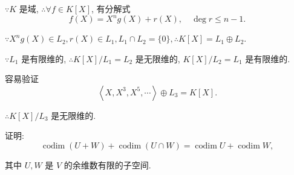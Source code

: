 \documentclass[color=black,device=normal,lang=cn,mode=geye]{elegantnote}
\begin{document}
\begin{solution}
    $\because K$ 是域, $\therefore\forall f\in K[X]$, 有分解式
    \[f(X)=X^ng(X)+r(X),\quad\deg r\leq n-1.\]

    $\because X^ng(X)\in L_2,r(X)\in L_1,L_1\cap L_2=\{0\},\therefore K[X]=L_1\oplus L_2$.

    $\because L_1$ 是有限维的, $\therefore K[X]/L_1=L_2$ 是无限维的, $K[X]/L_2=L_1$ 是有限维的.

    容易验证
    \[\left<X,X^3,X^5,\cdots\right>\oplus L_3=K[X].\]

    $\therefore K[X]/L_3$ 是无限维的.
\end{solution}
\begin{exercise}%
    证明:
    \[\operatorname{codim}(U+W)+\operatorname{codim}(U\cap W)=\operatorname{codim}U+\operatorname{codim}W,\]

    其中 $U,W$ 是 $V$ 的余维数有限的子空间.
\end{exercise}
\end{document}
